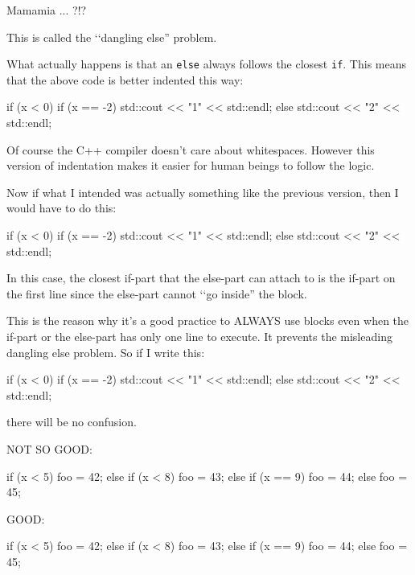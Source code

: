 Mamamia ... ?!?

This is called the \lq\lq dangling else'' problem.

What actually happens is that an \texttt{else} always follows the closest
\texttt{if}. This means that the above code is better indented this way:
\begin{console}
if (x < 0)
   if (x == -2) std::cout << "1" << std::endl;
   else
       std::cout << "2" << std::endl; 
\end{console}

Of course the C++ compiler doesn't care about
whitespaces. However this version of indentation makes it easier for
human beings to follow the logic.

Now if what I intended was actually something like the previous version,
then I would have to do this:
\begin{console}
if (x < 0)
{
   if (x == -2) std::cout << "1" << std::endl;
}
else
    std::cout << "2" << std::endl; 
\end{console}
In this case, the closest if-part that the else-part can attach to is
the if-part on the first line since the else-part cannot \lq\lq go inside''
the block.

This is the reason why it's a good practice to ALWAYS
use blocks even when the if-part or the else-part has only one line to
execute. It prevents the misleading dangling else problem. So if I write
this:
\begin{console}
if (x < 0)
{
   if (x == -2)
   {
       std::cout << "1" << std::endl;
   }
}
else
{
     std::cout << "2" << std::endl;
}
\end{console}

there will be no confusion.

\newpage{}

NOT SO GOOD:\\
\begin{console}
if (x < 5)
{
    foo = 42;
}
else
{
     if (x < 8)
     {
         foo = 43;
     }
     else
     {
         if (x == 9)
         {
             foo = 44;
         }
         else
         {
             foo = 45;
         }
     }
}
\end{console}
GOOD:\\
\begin{console}
if (x < 5)
{
    foo = 42;
}
else if (x < 8)
{
    foo = 43;
}
else if (x == 9)
{
    foo = 44;
}
else
{
    foo = 45;
}
\end{console}

